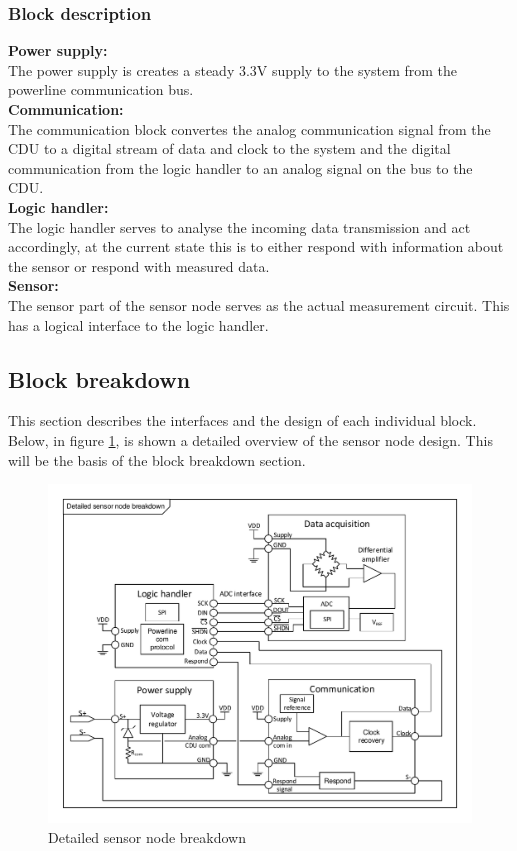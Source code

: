 \subsubsection{Block description}
\textbf{Power supply:}\\
The power supply is creates a steady 3.3V supply to the system from the powerline communication bus.\\

\textbf{Communication:}\\
The communication block convertes the analog communication signal from the CDU to a digital stream of data and clock to the system and the digital communication from the logic handler to an analog signal on the bus to the CDU.\\

\textbf{Logic handler:}\\
The logic handler serves to analyse the incoming data transmission and act accordingly, at the current state this is to either respond with information about the sensor or respond with measured data.\\

\textbf{Sensor:}\\
The sensor part of the sensor node serves as the actual measurement circuit. This has a logical interface to the logic handler.\\

\subsection{Block breakdown}
This section describes the interfaces and the design of each individual block.\\
Below, in figure \ref{fig:SN_detailed}, is shown a detailed overview of the sensor node design. This will be the basis of the block breakdown section.

\begin{figure}[H]
	\centering
	\includegraphics[width=1\textwidth]{billeder/SN_detailed_design}
	\caption{Detailed sensor node breakdown}
	\label{fig:SN_detailed}
\end{figure}

